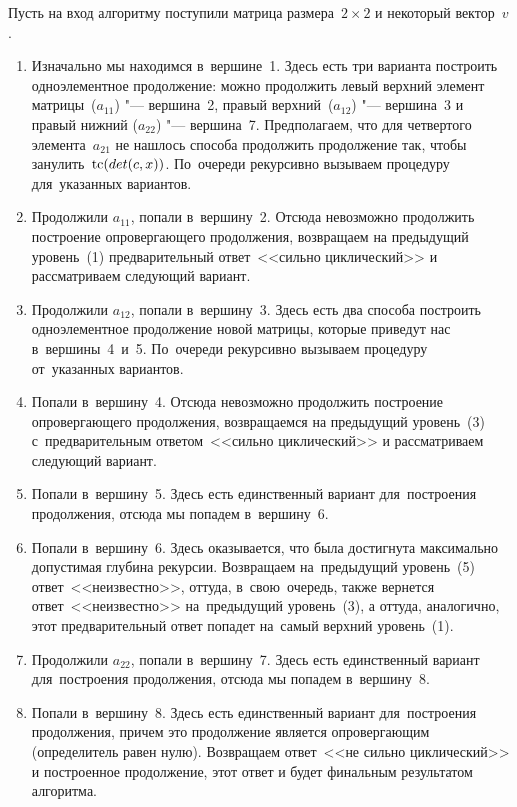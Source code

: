 Пусть на вход алгоритму поступили матрица размера~$2 \times 2$ и некоторый вектор~$v$.
\newpage

\begin{enumerate}
    \item
        Изначально мы находимся в~вершине~1.
        Здесь есть три варианта построить одноэлементное продолжение:
        можно продолжить левый верхний элемент матрицы~($a_{11}$) "--- вершина~2,
        правый верхний~($a_{12}$) "--- вершина~3 и правый нижний ($a_{22}$) "--- вершина~7.
        Предполагаем, что для четвертого элемента~$a_{21}$ не нашлось способа продолжить продолжение так,
        чтобы занулить~$\mathop{\rm tc}(det(c, x))$.
        По~очереди рекурсивно вызываем процедуру для~указанных вариантов.
    \item
        Продолжили $a_{11}$, попали в~вершину~2. Отсюда невозможно продолжить построение опровергающего продолжения,
        возвращаем на предыдущий уровень~(1) предварительный ответ~<<сильно циклический>> и рассматриваем следующий вариант.
    \item
        Продолжили $a_{12}$, попали в~вершину~3. Здесь есть два способа построить одноэлементное продолжение новой матрицы,
        которые приведут нас в~вершины~4~и~5.
        По~очереди рекурсивно вызываем процедуру от~указанных вариантов.
    \item
        Попали в~вершину~4. Отсюда невозможно продолжить построение опровергающего продолжения,
        возвращаемся на предыдущий уровень~(3) с~предварительным ответом~<<сильно циклический>> и рассматриваем следующий вариант.
    \item
        Попали в~вершину~5. Здесь есть единственный вариант для~построения продолжения,
        отсюда мы попадем в~вершину~6.
    \item
        Попали в~вершину~6. Здесь оказывается, что была достигнута максимально допустимая глубина рекурсии.
        Возвращаем на~предыдущий уровень~(5) ответ~<<неизвестно>>,
        оттуда, в~свою~очередь, также вернется ответ~<<неизвестно>> на~предыдущий уровень~(3),
        а оттуда, аналогично, этот предварительный ответ попадет на~самый верхний уровень~(1).
    \item
        Продолжили $a_{22}$, попали в~вершину~7. Здесь есть единственный вариант для~построения продолжения,
        отсюда мы попадем в~вершину~8.
    \item
        Попали в~вершину~8. Здесь есть единственный вариант для~построения продолжения,
        причем это продолжение является опровергающим (определитель равен нулю).
        Возвращаем ответ~<<не сильно циклический>> и построенное продолжение,
        этот ответ и будет финальным результатом алгоритма.
\end{enumerate}

